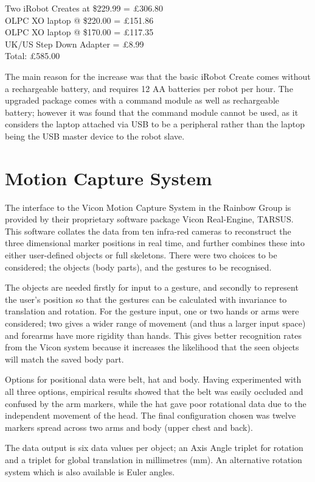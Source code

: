 \documentclass[12pt,a4,notitlepage]{report}
\renewcommand{\_}{\texttt{\symbol{95}}}
\newcommand{\<}{\texttt{\symbol{60}}}
\renewcommand{\>}{\texttt{\symbol{62}}}
\begin{document}
Two iRobot Creates at \$229.99 = \pounds 306.80 \\
OLPC XO laptop @ \$220.00 = \pounds 151.86 \\
OLPC XO laptop @ \$170.00 = \pounds 117.35 \\
UK/US Step Down Adapter = \pounds 8.99 \\
Total: \pounds 585.00

The main reason for the increase was that the basic iRobot Create comes without a rechargeable battery, and requires 12 AA batteries per robot per hour. The upgraded package comes with a command module as well as rechargeable battery; however it was found that the command module cannot be used, as it considers the laptop attached via USB to be a peripheral rather than the laptop being the USB master device to the robot slave.

\section{Motion Capture System}

The interface to the Vicon Motion Capture System in the Rainbow Group is provided by their proprietary software package Vicon Real-Engine, TARSUS\cite{Vicon}. This software collates the data from ten infra-red cameras to reconstruct the three dimensional marker positions in real time, and further combines these into either user-defined objects or full skeletons. There were two choices to be considered; the objects (body parts), and the gestures to be recognised.

The objects are needed firstly for input to a gesture, and secondly to represent the user's position so that the gestures can be calculated with invariance to translation and rotation. For the gesture input, one or two hands or arms were considered; two gives a wider range of movement (and thus a larger input space) and forearms have more rigidity than hands. This gives better recognition rates from the Vicon system because it increases the likelihood that the seen objects will match the saved body part.

Options for positional data were belt, hat and body. Having experimented with all three options, empirical results showed that the belt was easily occluded and confused by the arm markers, while the hat gave poor rotational data due to the independent movement of the head. The final configuration chosen was twelve markers spread across two arms and body (upper chest and back).

The data output is six data values per object; an Axis Angle triplet for rotation and a triplet for global translation in millimetres (mm). An alternative rotation system which is also available is Euler angles.
\end{document}
